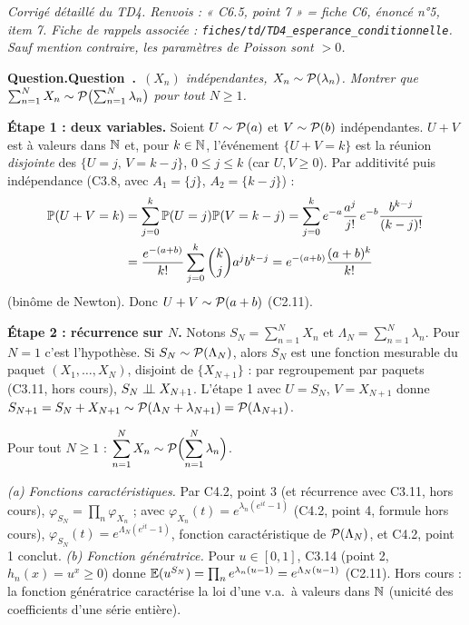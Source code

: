 \documentclass[11pt,a4paper]{article}
\newcommand{\question}[2]{\par\medskip\noindent\textbf{\ifx\relax#1\relax Question.\else Question~#1.\fi}~\textit{#2}\par\smallskip}
\begin{document}

\textit{Corrigé détaillé du TD4. Renvois : « C6.5, point 7 » = fiche C6, énoncé n°5, item 7. Fiche de rappels associée :
\texttt{fiches/td/TD4\_esperance\_conditionnelle}. Sauf mention contraire, les paramètres de Poisson sont $>0$.}

\begin{exo}
\question{}{$(X_n)$ indépendantes, $X_n\sim\mathcal{P}(\lambda_n)$. Montrer que $\sum_{n=1}^NX_n\sim\mathcal{P}\bigl(\sum_{n=1}^N\lambda_n\bigr)$ pour tout $N\ge1$.}

\textbf{Étape 1 : deux variables.} Soient $U\sim\mathcal{P}(a)$ et $V\sim\mathcal{P}(b)$ indépendantes. $U+V$ est à valeurs dans $\mathbb{N}$ et, pour $k\in\mathbb{N}$,
l'événement $\{U+V=k\}$ est la réunion \emph{disjointe} des $\{U=j,\,V=k-j\}$, $0\le j\le k$ (car $U,V\ge0$). Par additivité puis
indépendance (C3.8, avec $A_1=\{j\}$, $A_2=\{k-j\}$) :
\begin{align*}\mathbb{P}(U+V=k)&=\sum_{j=0}^k\mathbb{P}(U=j)\mathbb{P}(V=k-j)=\sum_{j=0}^ke^{-a}\frac{a^j}{j!}\,e^{-b}\frac{b^{k-j}}{(k-j)!}\\
&=\frac{e^{-(a+b)}}{k!}\sum_{j=0}^k\binom kja^jb^{k-j}=e^{-(a+b)}\frac{(a+b)^k}{k!}\end{align*}
(binôme de Newton). Donc $U+V\sim\mathcal{P}(a+b)$ (C2.11).

\textbf{Étape 2 : récurrence sur $N$.} Notons $S_N=\sum_{n=1}^NX_n$ et $\Lambda_N=\sum_{n=1}^N\lambda_n$. Pour $N=1$ c'est l'hypothèse.
Si $S_N\sim\mathcal{P}(\Lambda_N)$, alors $S_N$ est une fonction mesurable du paquet $(X_1,\dots,X_N)$, disjoint de $\{X_{N+1}\}$ : par
regroupement par paquets (C3.11, hors cours), $S_N\perp\!\!\!\perp X_{N+1}$. L'étape 1 avec $U=S_N$, $V=X_{N+1}$ donne
$S_{N+1}=S_N+X_{N+1}\sim\mathcal{P}(\Lambda_N+\lambda_{N+1})=\mathcal{P}(\Lambda_{N+1})$.

\begin{resultat}
Pour tout $N\ge1$ : $\displaystyle\sum_{n=1}^NX_n\sim\mathcal{P}\Bigl(\sum_{n=1}^N\lambda_n\Bigr)$.
\end{resultat}

\begin{remarque}[variantes]
\emph{(a) Fonctions caractéristiques.} Par C4.2, point 3 (et récurrence avec C3.11, hors cours), $\varphi_{S_N}=\prod_n\varphi_{X_n}$ ; avec
$\varphi_{X_n}(t)=e^{\lambda_n(e^{it}-1)}$ (C4.2, point 4, formule hors cours), $\varphi_{S_N}(t)=e^{\Lambda_N(e^{it}-1)}$, fonction caractéristique
de $\mathcal{P}(\Lambda_N)$, et C4.2, point 1 conclut.
\emph{(b) Fonction génératrice.} Pour $u\in[0,1]$, C3.14 (point 2, $h_n(x)=u^x\ge0$) donne $\mathbb{E}(u^{S_N})=\prod_n e^{\lambda_n(u-1)}=e^{\Lambda_N(u-1)}$
(C2.11). Hors cours : la fonction génératrice caractérise la loi d'une v.a.\ à valeurs dans $\mathbb{N}$ (unicité des coefficients d'une série entière).
\end{remarque}
\end{exo}
\end{document}

